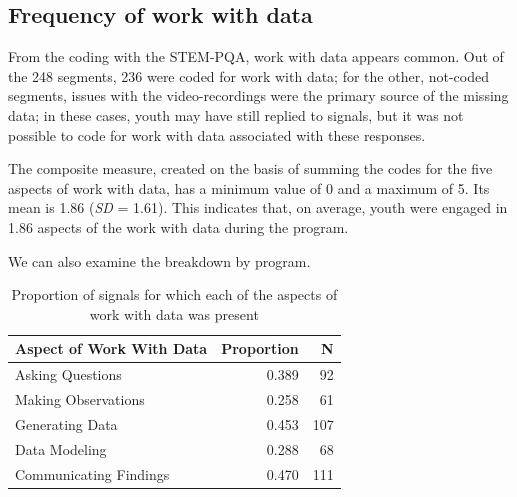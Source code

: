 \documentclass[]{msu-thesis}
\theoremstyle{definition}
\theoremstyle{definition}
\theoremstyle{definition}
\theoremstyle{remark}
\begin{document}
\subsection{Frequency of work with
data}\label{frequency-of-work-with-data}

From the coding with the STEM-PQA, work with data appears common. Out of
the 248 segments, 236 were coded for work with data; for the other,
not-coded segments, issues with the video-recordings were the primary
source of the missing data; in these cases, youth may have still replied
to signals, but it was not possible to code for work with data
associated with these responses.

The composite measure, created on the basis of summing the codes for the
five aspects of work with data, has a minimum value of 0 and a maximum
of 5. Its mean is 1.86 (\emph{SD} = 1.61). This indicates that, on
average, youth were engaged in 1.86 aspects of the work with data during
the program.

We can also examine the breakdown by program.

\begin{table}

\caption{\label{tab:unnamed-chunk-9}Proportion of signals for which each of the aspects of work with data was present}
\centering
\begin{tabular}[t]{lrr}
\toprule
Aspect of Work With Data & Proportion & N\\
\midrule
Asking Questions & 0.389 & 92\\
Making Observations & 0.258 & 61\\
Generating Data & 0.453 & 107\\
Data Modeling & 0.288 & 68\\
Communicating Findings & 0.470 & 111\\
\bottomrule
\end{tabular}
\end{table}
\end{document}
